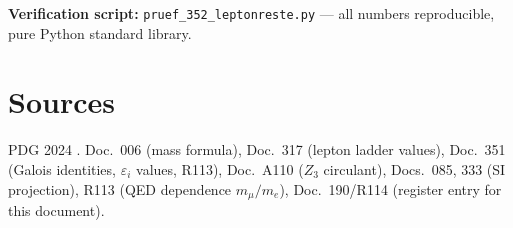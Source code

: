 \bigskip\noindent
\textbf{Verification script:}
\texttt{pruef\_352\_leptonreste.py} --- all numbers reproducible, pure Python standard library.

\section*{Sources}

PDG 2024 \QM. Doc.~006 (mass formula), Doc.~317 (lepton ladder values),
Doc.~351 (Galois identities, $\varepsilon_i$ values, R113), Doc.~A110
($Z_3$ circulant), Docs.~085, 333 (SI projection), R113 (QED dependence
$m_\mu/m_e$), Doc.~190/R114 (register entry for this document).
